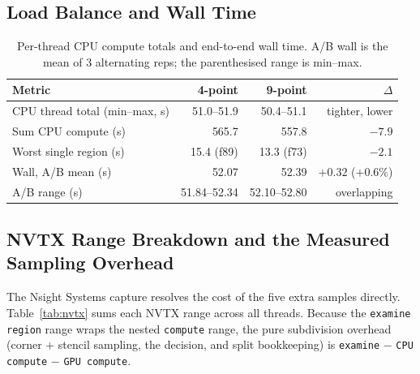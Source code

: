\documentclass[
	english,
	letterpaper, oneside
]{article}
\begin{document}
\subsection{Load Balance and Wall Time}

\begin{table}[H]
    \centering
    \caption{Per-thread CPU compute totals and end-to-end wall time.
             A/B wall is the mean of 3 alternating reps; the parenthesised
             range is min--max.}
    \label{tab:wall}
    \begin{tabular}{lrrr}
        \hline
        Metric & 4-point & 9-point & $\Delta$ \\
        \hline
        CPU thread total (min--max, s) & 51.0--51.9 & 50.4--51.1 & tighter, lower \\
        Sum CPU compute (s)            & 565.7      & 557.8      & $-7.9$ \\
        Worst single region (s)        & 15.4 (f89) & 13.3 (f73) & $-2.1$ \\
        Wall, A/B mean (s)             & 52.07 & 52.39 & $+0.32$ ($+0.6\%$) \\
        \quad A/B range (s)            & 51.84--52.34 & 52.10--52.80 & overlapping \\
        \hline
    \end{tabular}
\end{table}

\subsection{NVTX Range Breakdown and the Measured Sampling Overhead}

The Nsight Systems capture resolves the cost of the five extra samples
directly. Table~\ref{tab:nvtx} sums each NVTX range across all threads. Because
the \texttt{examine region} range wraps the nested \texttt{compute} range, the
pure subdivision overhead (corner + stencil sampling, the decision, and split
bookkeeping) is \texttt{examine} $-$ \texttt{CPU compute} $-$ \texttt{GPU
compute}.
\end{document}
